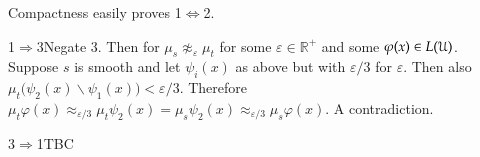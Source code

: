 \documentclass[10pt,oneside, openany]{book}
\def\RR{\mathds R}
\def\sm{\smallsetminus}
\def\IMP{\Rightarrow}
\def\IFF{\Leftrightarrow}
\def\U{\EuScript U}
\def\phi{\varphi}
\def\epsilon{\varepsilon}
\def\ssf#1{\textsf{\footnotesize #1}}
\theoremstyle{mio}
\theoremstyle{liscio}
\def\QED{\noindent\nolinebreak[4]\hfill\rlap{\ \ $\Box$}\medskip}
\renewenvironment{proof}[1][Proof]%
{\smallskip\begin{trivlist}\item[\hskip\labelsep {\bf #1}]}
{\QED\end{trivlist}}
\begin{document}
\begin{proof}
  Compactness easily proves \ssf1$\IFF$\ssf2.
  
  \ssf1$\IMP$\ssf3\quad Negate \ssf3. 
  Then for $\mu_s\napprox_\epsilon\mu_t$ for some $\epsilon\in\RR^+$ and some $\phi(x)\in L(\U)$.
  Suppose $s$ is smooth and let $\psi_i(x)$ as above but with $\epsilon/3$ for $\epsilon$.
  Then also $\mu_t\big(\psi_2(x)\sm\psi_1(x)\big)<\epsilon/3$.
  Therefore $\mu_t\phi(x)\approx_{\epsilon/3}\mu_t\psi_2(x)=\mu_s\psi_2(x)\approx_{\epsilon/3}\mu_s\phi(x)$.
  A contradiction.

  \ssf3$\IMP$\ssf1\quad TBC
\end{proof}

\end{document}
